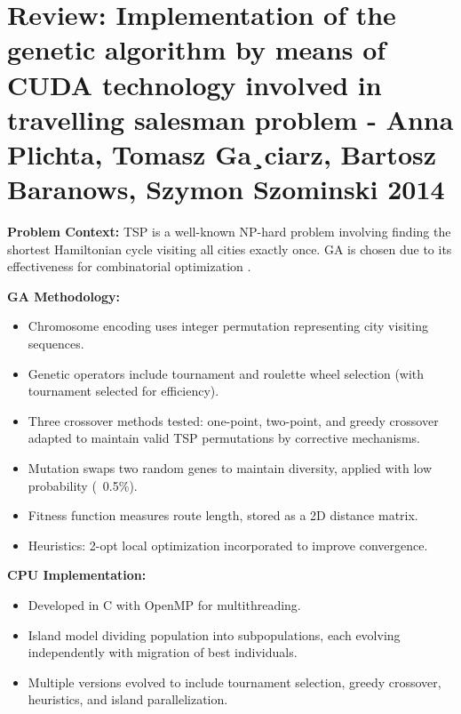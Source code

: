 \documentclass{article}
\begin{document}
\section*{Review: Implementation of the genetic algorithm by means of CUDA technology involved in travelling salesman problem  - Anna Plichta, Tomasz Ga¸ciarz, Bartosz Baranows, Szymon Szominski 2014}

\item \textbf{Problem Context:} TSP is a well-known NP-hard problem involving finding the shortest Hamiltonian cycle visiting all cities exactly once. GA is chosen due to its effectiveness for combinatorial optimization \cite{plichta2014cuda}.

\item \textbf{GA Methodology:}
\begin{itemize}
    \item Chromosome encoding uses integer permutation representing city visiting sequences.
    \item Genetic operators include tournament and roulette wheel selection (with tournament selected for efficiency).
    \item Three crossover methods tested: one-point, two-point, and greedy crossover adapted to maintain valid TSP permutations by corrective mechanisms.
    \item Mutation swaps two random genes to maintain diversity, applied with low probability (~0.5\%).
    \item Fitness function measures route length, stored as a 2D distance matrix.
    \item Heuristics: 2-opt local optimization incorporated to improve convergence.
\end{itemize}

\item \textbf{CPU Implementation:}
\begin{itemize}
    \item Developed in C with OpenMP for multithreading.
    \item Island model dividing population into subpopulations, each evolving independently with migration of best individuals.
    \item Multiple versions evolved to include tournament selection, greedy crossover, heuristics, and island parallelization.
\end{itemize}
\end{document}
